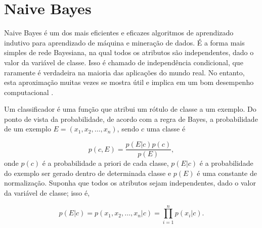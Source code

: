 \section{Naive Bayes}


Naive Bayes é um dos mais eficientes e eficazes algoritmos de aprendizado indutivo para aprendizado de máquina e mineração de dados. É a forma mais simples de rede Bayesiana, na qual todos os atributos são independentes, dado o valor da variável de classe. Isso é chamado de independência condicional, que raramente é verdadeira na maioria das aplicações do mundo real. No entanto, esta aproximação muitas vezes se mostra útil e implica em um bom desempenho computacional \cite{zhang2004}.






Um classificador é uma função que atribui um rótulo de classe a um exemplo. Do ponto de vista da probabilidade, de acordo com a regra de Bayes, a probabilidade de um exemplo $E = (x_1, x_2, \dots, x_n)$, sendo $c$ uma classe é


\begin{equation}
p(c,E) = \frac{p(E|c)p(c)}{p(E)},
\end{equation} 
%
onde $p(c)$ é a probabilidade a priori de cada classe, $p(E|c)$ é a probabilidade do exemplo ser gerado dentro de determinada classe e $p(E)$ é uma constante de normalização.
Suponha que todos os atributos sejam independentes, dado o valor da variável de classe; isso é,

\begin{equation}
p(E|c) = p(x_1, x_2, \dots, x_n|c) = \prod_{i=1}^{n} p(x_i|c).
\end{equation}

